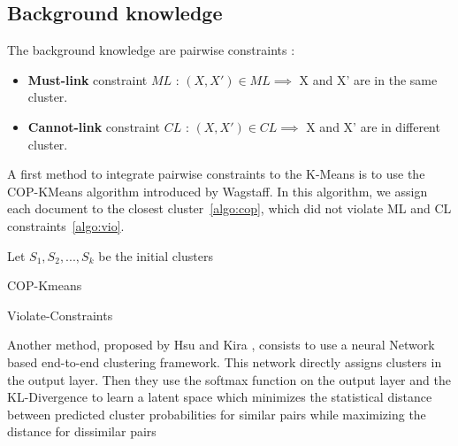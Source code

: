 \subsection{Background knowledge}
The background knowledge are pairwise constraints :
\begin{itemize}
\item \textbf{Must-link} constraint $ML$ : $(X, X') \in ML \implies $ X and X' are in the
  same cluster.
\item \textbf{Cannot-link} constraint $CL$ : $(X, X') \in CL \implies $ X and X' are in
  different cluster.
\end{itemize}
A first method to integrate pairwise constraints to the K-Means is to use the 
COP-KMeans algorithm introduced by Wagstaff\cite{Wagstaff:2001:CKC:645530.655669}.
In this algorithm, we assign each document to the closest cluster~\ref{algo:cop}, 
which did not violate ML and CL constraints~\ref{algo:vio}.
\begin{algorithm}[!h]
  Let $S_1, S_2 , ..., S_k$ be the initial clusters\\
  \caption{\label{algo:cop}COP-Kmeans}
\end{algorithm}
\begin{algorithm}[!h]
  \caption{\label{algo:vio}Violate-Constraints}
\end{algorithm}
Another method, proposed by Hsu and Kira \cite{2015arXiv151106321H}, consists to 
use a neural Network based end-to-end clustering framework. This network 
directly assigns clusters in the output layer. Then they use the softmax 
function on the output layer and the KL-Divergence to learn a latent space 
which minimizes the statistical distance between predicted cluster probabilities 
for similar pairs while maximizing the distance for dissimilar pairs

